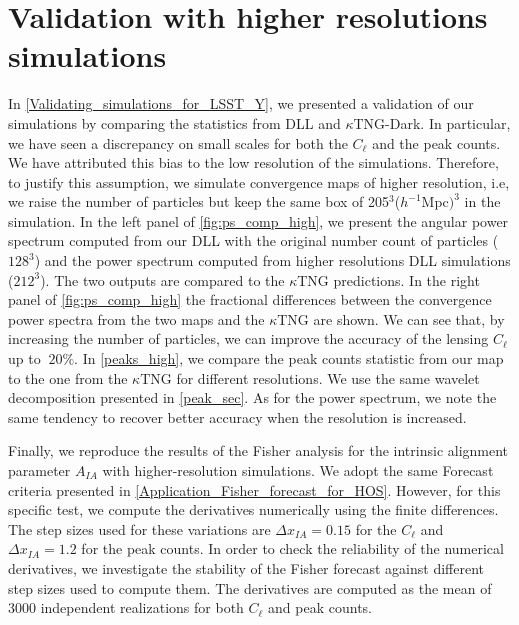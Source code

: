 \documentclass[twocolumn,twocolappendix]{aastex63}
\begin{document}
\section{Validation with higher resolutions simulations}
In \autoref{Validating_simulations_for_LSST_Y}, we presented a validation of our simulations by comparing the statistics from DLL and $\kappa$TNG-Dark.
In particular, we have seen a discrepancy on small scales for both the $C_{\ell}$ and the peak counts. We have attributed this bias to the low resolution of the simulations. Therefore, to justify this assumption, we simulate convergence maps of higher resolution, i.e, we raise the number of particles but keep the same box of 205$^3$($h^{-1}$Mpc$)^3$ in the simulation. In the left panel of  \autoref{fig:ps_comp_high}, we present the angular power spectrum computed from our DLL with the original number count of particles ($128^3$) and the power spectrum computed from higher resolutions DLL simulations ($212^3$). The two outputs are compared to the $\kappa$TNG predictions. In the right panel  of \autoref{fig:ps_comp_high} the fractional differences between the convergence power spectra from the two maps and the $\kappa$TNG are shown. We can see that, by increasing the number of particles, we can improve the accuracy of the lensing $C_{\ell}$ up to $~20\%$.
In \autoref{peaks_high}, we compare the peak counts statistic from our map to the one from the $\kappa$TNG for different resolutions. We use the same wavelet decomposition presented in \autoref{peak_sec}. As for the power spectrum, we note the same tendency to recover better accuracy when the resolution is increased. 

Finally, we reproduce the results of the Fisher analysis for the intrinsic alignment parameter $A_{IA}$ with higher-resolution simulations. We adopt the same Forecast criteria presented in \autoref{Application_Fisher_forecast_for_HOS}. However, for this specific test, we compute the derivatives numerically using the finite differences. The step sizes used for these variations are $\Delta x_{IA}=0.15$ for the $C_{\ell}$ and $\Delta x_{IA}=1.2$ for the peak counts. 
In order to check the reliability of the numerical derivatives, we investigate the stability of the Fisher forecast against different step sizes used to compute them.
The derivatives are computed as the mean of 3000 independent realizations for both $C_{\ell}$ and peak counts. 
\end{document}
